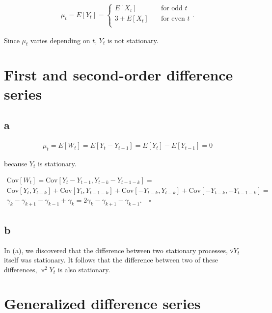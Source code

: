 \documentclass[]{book}
\theoremstyle{definition}
\theoremstyle{definition}
\theoremstyle{remark}
\begin{document}
\begin{gather*}
  \mu_t = E[Y_t] = 
    \begin{cases}
      E[X_t]       & \quad \text{for odd } t\\
      3 + E[X_t]   & \quad \text{for even } t\\
    \end{cases}.
\end{gather*}

Since \(\mu_t\) varies depending on \(t\), \(Y_t\) is not stationary.

\section{First and second-order difference
series}\label{first-and-second-order-difference-series}

\subsection*{a}\label{a-5}

\begin{gather*}\mu_t = E[W_t] = E[Y_t - Y_{t-1}] = E[Y_t] - E[Y_{t-1}] = 0\end{gather*}

because \(Y_t\) is stationary.

\begin{gather*}
  \text{Cov}[W_t] = \text{Cov}[Y_t - Y_{t-1}, Y_{t-k} - Y_{t-1-k}] = \\
  \text{Cov}[Y_t, Y_{t-k}] + \text{Cov}[Y_t, Y_{t-1-k}] + \text{Cov}[-Y_{t-k}, Y_{t-k}] + \text{Cov}[-Y_{t-k}, -Y_{t-1-k}]=\\
  \gamma_k-\gamma_{k+1}-\gamma_{k-1}+\gamma_{k} = 2 \gamma_k - \gamma_{k+1} - \gamma_{k-1}. \quad \square
\end{gather*}

\subsection*{b}\label{b-5}

In (a), we discovered that the difference between two stationary
processes, \(\triangledown Y_t\) itself was stationary. It follows that
the difference between two of these differences, \(\triangledown^2Y_t\)
is also stationary.

\section{Generalized difference
series}\label{generalized-difference-series}
\end{document}
